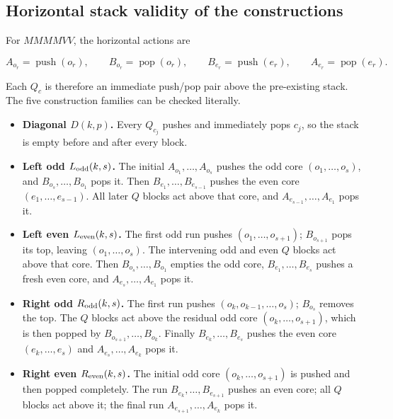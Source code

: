 \documentclass[11pt]{article}
\theoremstyle{definition}
\theoremstyle{remark}
\providecommand{\tightlist}{\setlength{\itemsep}{0pt}\setlength{\parskip}{0pt}}
\begin{document}
\subsection{Horizontal stack validity of the
constructions}\label{d.4.-horizontal-stack-validity-of-the-constructions}

For \(MMMMVV\), the horizontal actions are

\[
A_{o_r}=\operatorname{push}(o_r),\qquad B_{o_r}=\operatorname{pop}(o_r),\qquad
B_{e_r}=\operatorname{push}(e_r),\qquad A_{e_r}=\operatorname{pop}(e_r).
\]

Each \(Q_c\) is therefore an immediate push/pop pair above the
pre-existing stack. The five construction families can be checked
literally.

\begin{itemize}
\tightlist
\item
  \textbf{Diagonal \(D(k,p)\).} Every \(Q_{c_j}\) pushes and immediately
  pops \(c_j\), so the stack is empty before and after every block.
\item
  \textbf{Left odd \(L_{\rm odd}(k,s)\).} The initial
  \(A_{o_1},\ldots,A_{o_s}\) pushes the odd core \((o_1,\ldots,o_s)\),
  and \(B_{o_s},\ldots,B_{o_1}\) pops it. Then
  \(B_{e_1},\ldots,B_{e_{s-1}}\) pushes the even core
  \((e_1,\ldots,e_{s-1})\). All later \(Q\) blocks act above that core,
  and \(A_{e_{s-1}},\ldots,A_{e_1}\) pops it.
\item
  \textbf{Left even \(L_{\rm even}(k,s)\).} The first odd run pushes
  \((o_1,\ldots,o_{s+1})\); \(B_{o_{s+1}}\) pops its top, leaving
  \((o_1,\ldots,o_s)\). The intervening odd and even \(Q\) blocks act
  above that core. Then \(B_{o_s},\ldots,B_{o_1}\) empties the odd core,
  \(B_{e_1},\ldots,B_{e_s}\) pushes a fresh even core, and
  \(A_{e_s},\ldots,A_{e_1}\) pops it.
\item
  \textbf{Right odd \(R_{\rm odd}(k,s)\).} The first run pushes
  \((o_k,o_{k-1},\ldots,o_s)\); \(B_{o_s}\) removes the top. The \(Q\)
  blocks act above the residual odd core \((o_k,\ldots,o_{s+1})\), which
  is then popped by \(B_{o_{s+1}},\ldots,B_{o_k}\). Finally
  \(B_{e_k},\ldots,B_{e_s}\) pushes the even core \((e_k,\ldots,e_s)\)
  and \(A_{e_s},\ldots,A_{e_k}\) pops it.
\item
  \textbf{Right even \(R_{\rm even}(k,s)\).} The initial odd core
  \((o_k,\ldots,o_{s+1})\) is pushed and then popped completely. The run
  \(B_{e_k},\ldots,B_{e_{s+1}}\) pushes an even core; all \(Q\) blocks
  act above it; the final run \(A_{e_{s+1}},\ldots,A_{e_k}\) pops it.
\end{itemize}
\end{document}
